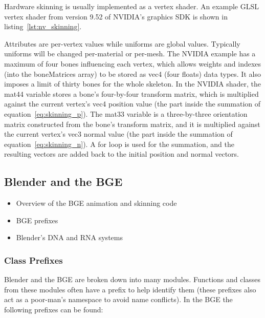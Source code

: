 Hardware skinning is usually implemented as a vertex shader.
An example GLSL vertex shader from version 9.52 of NVIDIA's graphics SDK\cite{nvidiasdk} is shown in listing~\ref{lst:nv_skinning}.


Attributes are per-vertex values while uniforms are global values.
Typically uniforms will be changed per-material or per-mesh.
The NVIDIA example has a maximum of four bones influencing each vertex, which allows weights and indexes (into the boneMatrices array) to be stored as vec4 (four floats) data types.
It also imposes a limit of thirty bones for the whole skeleton.
In the NVIDIA shader, the mat44 variable stores a bone's four-by-four transform matrix, which is multiplied against the current vertex's vec4 position value (the part inside the summation of equation~\ref{eq:skinning_p}).
The mat33 variable is a three-by-three orientation matrix constructed from the bone's transform matrix, and it is multiplied against the current vertex's vec3 normal value (the part inside the summation of equation~\ref{eq:skinning_n}).
A for loop is used for the summation, and the resulting vectors are added back to the initial position and normal vectors.

\subsection{Blender and the BGE}
\ifsummaries
\begin{itemize}
 \item Overview of the BGE animation and skinning code
 \item BGE prefixes
 \item Blender's DNA and RNA systems
\end{itemize}
\fi

\subsubsection{Class Prefixes}
Blender and the BGE are broken down into many modules.
Functions and classes from these modules often have a prefix to help identify them (these prefixes also act as a poor-man's namespace to avoid name conflicts).
In the BGE the following prefixes can be found:

